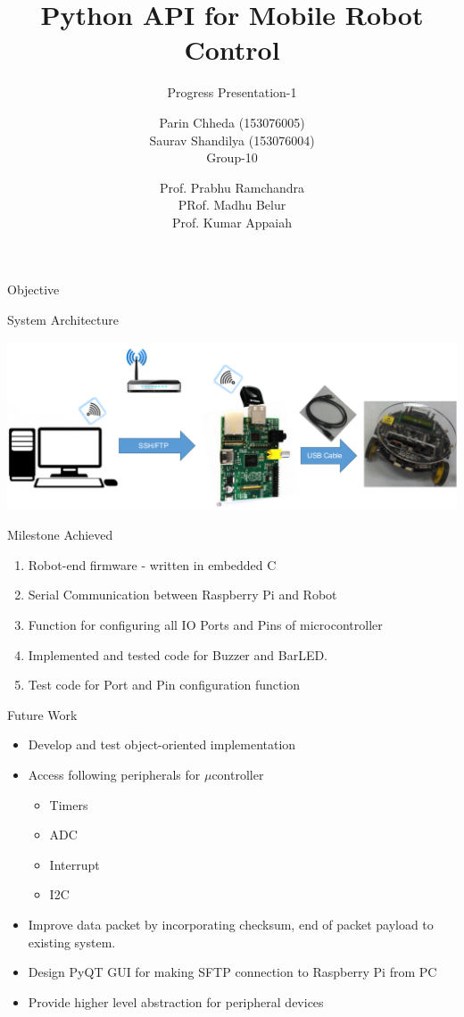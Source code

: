 \documentclass[10pt,handout,english]{beamer}
\title[] %
{Python API for Mobile Robot Control}
\subtitle{Progress Presentation-1}
\author[AE-663 Course Project ] %
{Parin Chheda (153076005) \\ Saurav Shandilya (153076004) \\ Group-10 }
\institute [Indian Institute of Technology Bombay]%
{
  
}
\date[\today] %
{Prof. Prabhu Ramchandra \\ PRof. Madhu Belur \\ Prof. Kumar Appaiah}
\begin{document}
\frame{\titlepage}

\begin{frame}{Objective}

\end{frame}

\begin{frame}{System Architecture}

\includegraphics[scale = 0.35]{system_diagram}

\end{frame}

\begin{frame}{Milestone Achieved}
\begin{enumerate}
\item Robot-end firmware - written in embedded C
\item Serial Communication between Raspberry Pi and Robot
\item Function for configuring all IO Ports and Pins of microcontroller
\item Implemented and tested code for Buzzer and BarLED.  
\item Test code for Port and Pin configuration function
\end{enumerate}

\end{frame}

\begin{frame}{Future Work}
\begin{itemize}
\item Develop and test object-oriented implementation
\item Access following peripherals for ${\mu}$controller
	\begin{itemize}
	\item Timers
	\item ADC
	\item Interrupt
	\item I2C
	\end{itemize}
\item Improve data packet by incorporating checksum, end of packet payload to existing system.
\item Design PyQT GUI for making SFTP connection to Raspberry Pi from PC
\item Provide higher level abstraction for peripheral devices  
\end{itemize}

\end{frame}
\end{document}

